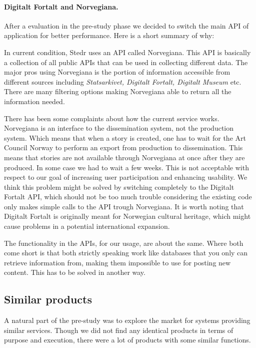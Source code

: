\paragraph{Digitalt Fortalt and Norvegiana.}

After a evaluation in the pre-study phase we decided to switch the main API of application for better performance. Here is a short summary of why:

In current condition, Stedr uses an API called Norvegiana. This API is basically a collection of all public APIs that can be used in collecting different data. The major pros using Norvegiana is the portion of information accessible from different sources including \emph{Statsarkivet, Digitalt Fortalt, Digitalt Museum} etc. There are many filtering options making Norvegiana able to return all the information needed.

There has been some complaints about how the current service works. Norvegiana is an interface to the dissemination system, not the production system. Which means that when a story is created, one has to wait for the Art Council Norway to perform an export from production to dissemination. This means that stories are not available through Norvegiana at once after they are produced. In some case we had to wait a few weeks. This is not acceptable with respect to our goal of increasing user participation and enhancing usability. We think this problem might be solved by switching completely to the Digitalt Fortalt API, which should not be too much trouble considering the existing code only makes simple calls to the API trough Norvegiana. It is worth noting that Digitalt Fortalt is originally meant for Norwegian cultural heritage, which might cause problems in a potential international expansion.

The functionality in the APIs, for our usage, are about the same. Where both come short is that both strictly speaking work like databases that you only can retrieve information from, making them impossible to use for posting new content. This has to be solved in another way.

	\subsection{Similar products}
		
A natural part of the pre-study was to explore the market for systems providing similar services. Though we did not find any identical products in terms of purpose and execution, there were a lot of products with some similar functions. 


